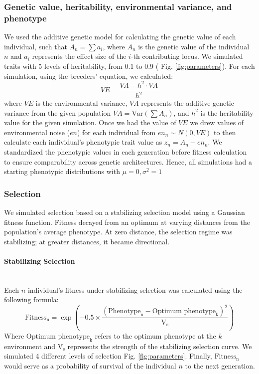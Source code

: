 \documentclass{article}
\let\oldparagraph\paragraph
\renewcommand{\paragraph}[1]{\oldparagraph{#1}\mbox{}\\}
\begin{document}
\subsubsection{Genetic value, heritability, environmental variance, and phenotype}
We used the additive genetic model for calculating the genetic value of each individual, such that $A_n=\sum a_i$, where $A_n$ is the genetic value of the individual $n$ and \( a_i \) represents the effect size of the \( i \)-th contributing locus. We simulated traits with 5 levels of heritability, from 0.1 to 0.9 ( Fig. \ref{fig:parameters}). For each simulation, using the breeders' equation, we calculated:
\[
VE = \frac{VA - h^2 \cdot VA}{h^2}
\]
where \( VE \) is the environmental variance, \(VA\) represents the additive genetic variance from the given population \( VA = \text{Var}\left(\sum A_n\right) \), and \( h^2 \) is the heritability value for the given simulation. Once we had the value of \( VE \) we drew values of environmental noise (\( en \)) for each individual from \( en_n \sim N(0, VE) \) to then calculate each individual's phenotypic trait value as \( z_n = A_n+ en_n \). We standardized the phenotypic values in each generation before fitness calculation to ensure comparability across genetic architectures. Hence, all simulations had a starting phenotypic distributions with $\mu = 0, \sigma^2 = 1$

\subsubsection{Selection}
We simulated selection based on a stabilizing selection model using a Gaussian fitness function. Fitness decayed from an optimum at varying distances from the population's average phenotype. At zero distance, the selection regime was stabilizing; at greater distances, it became directional.

\paragraph{Stabilizing Selection}
Each $n$ individual's fitness under stabilizing selection was calculated using the following formula:
\[
\text{Fitness}_\text{n} = \exp\left(-0.5 \times \frac{(\text{Phenotype}_\text{n} - {\text{Optimum phenotype}_\text{k}})^2}{\text{V}_\text{s}}\right)
\]
Where $\text{Optimum phenotype}_\text{k}$ refers to the optimum phenotype at the $k$ environment and $\text{V}_\text{s}$ represents the strength of the stabilizing selection curve. We simulated 4 different levels of selection Fig. \ref{fig:parameters}. Finally, $\text{Fitness}_\text{n}$ would serve as a probability of survival of the individual $n$ to the next generation.
\end{document}
